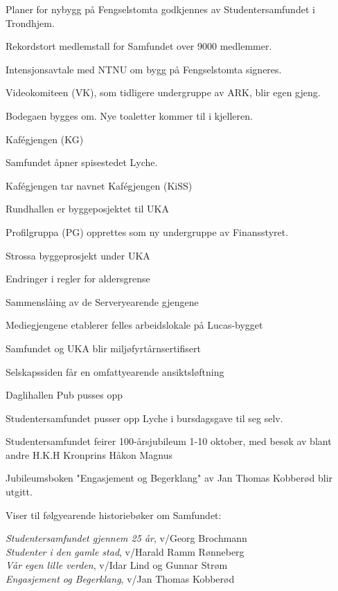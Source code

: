   \item Planer for nybygg på Fengselstomta godkjennes av Studentersamfundet i Trondhjem.
\yearend 

  \item Rekordstort medlemstall for Samfundet over 9000 medlemmer.
  \item Intensjonsavtale med NTNU om bygg på Fengselstomta signeres.
  \item Videokomiteen (VK), som tidligere undergruppe av ARK, blir egen gjeng.
  \item Bodegaen bygges om. Nye toaletter kommer til i kjelleren.
  \item Kafégjengen (KG)
\yearend 

  \item Samfundet åpner spisestedet Lyche.
  \item Kafégjengen tar navnet Kafégjengen (KiSS)
\yearend 

  \item Rundhallen er byggeposjektet til UKA
  \item Profilgruppa (PG) opprettes som ny undergruppe av Finansstyret.
\yearend 

 \item Strossa byggeprosjekt under UKA
 \item Endringer i regler for aldersgrense
 \item Sammenslåing av de Serveryearende gjengene
 \item Mediegjengene etablerer felles arbeidslokale på Lucas-bygget
 \item Samfundet og UKA blir miljøfyrtårnsertifisert
 \item Selskapssiden får en omfattyearende ansiktsløftning
 \item Daglihallen Pub pusses opp
\yearend 

 \item Studentersamfundet pusser opp Lyche i bursdagsgave til seg selv.
 \item Studentersamfundet feirer 100-årsjubileum 1-10 oktober, med besøk av blant andre H.K.H Kronprins Håkon 
 Magnus
 \item Jubileumsboken "Engasjement og Begerklang" av Jan Thomas Kobberød blir utgitt.
\yearend 

Viser til følgyearende historiebøker om Samfundet:

\textit{Studentersamfundet gjennem 25 år}, v/Georg Brochmann\\
\textit{Studenter i den gamle stad}, v/Harald Ramm Rønneberg\\
\textit{Vår egen lille verden}, v/Idar Lind og Gunnar Strøm\\
\textit{Engasjement og Begerklang}, v/Jan Thomas Kobberød
